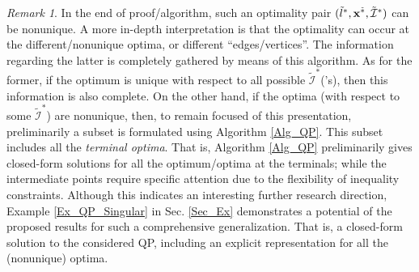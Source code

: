 \documentclass[9pt,twocolumn,twoside,lineno]{pnas-new-1}
\newcommand{\bfx}{{\bf x}}
\newcommand{\calI}{{\mathcal I}}
\theoremstyle{remark}
\newtheorem{remark}{Remark}[section]
\begin{document}
\begin{remark}
In the end of proof/algorithm, such an optimality pair $(\tilde l^*,\bfx^{\tilde *},\tilde\calI^*)$ can be nonunique. A more in-depth interpretation is that the optimality can occur at the different/nonunique optima, or different ``edges/vertices''. The information regarding the latter is completely gathered by means of this algorithm. As for the former, if the optimum is unique with respect to all possible $\tilde\calI^*$('s), then this information is also complete. On the other hand, if the optima (with respect to some $\tilde\calI^*$) are nonunique, then, to remain focused of this presentation, preliminarily a subset is formulated using Algorithm \ref{Alg_QP}. This subset includes all the \textit{terminal optima}. That is, Algorithm \ref{Alg_QP} preliminarily gives closed-form solutions for all the optimum/optima at the terminals; while the intermediate points require specific attention due to the flexibility of inequality constraints. Although this indicates an interesting further research direction, Example \ref{Ex_QP_Singular} in Sec. \ref{Sec_Ex} demonstrates a potential of the proposed results for such a comprehensive generalization. That is, a closed-form solution to the considered QP, including an explicit representation for all the (nonunique) optima.
\label{Rem_Terminal_Optima}
\end{remark}
\end{document}
